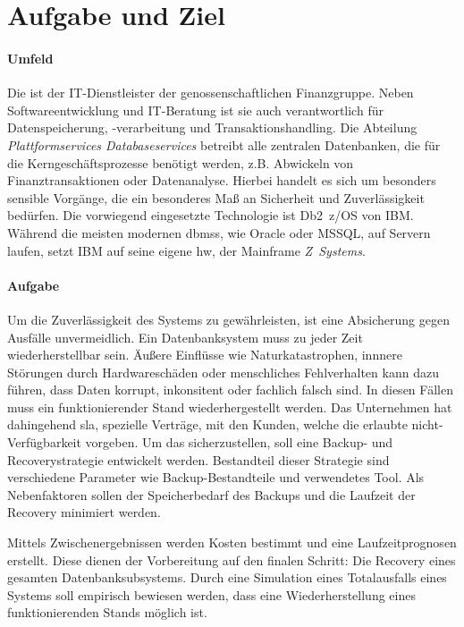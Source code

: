 \chapter{Aufgabe und Ziel}

\subsubsection{Umfeld}
Die \FirmenName ist der IT-Dienstleister der genossenschaftlichen Finanzgruppe. Neben Softwareentwicklung und IT-Beratung ist sie auch verantwortlich für Datenspeicherung, -verarbeitung und Transaktionshandling. Die Abteilung \emph{Plattformservices Databaseservices} betreibt alle zentralen Datenbanken, die für die Kerngeschäftsprozesse benötigt werden, z.B. Abwickeln von Finanztransaktionen oder Datenanalyse. Hierbei handelt es sich um besonders sensible Vorgänge, die ein besonderes Maß an Sicherheit und Zuverlässigkeit bedürfen. Die vorwiegend eingesetzte Technologie ist Db2~z/OS von IBM. Während die meisten modernen \acp{dbms}, wie Oracle oder MSSQL, auf Servern laufen, setzt IBM auf seine eigene \ac{hw}, der Mainframe \emph{\mbox{Z Systems}}. 

\subsubsection{Aufgabe}
Um die Zuverlässigkeit des Systems zu gewährleisten, ist eine Absicherung gegen Ausfälle unvermeidlich. Ein Datenbanksystem muss zu jeder Zeit wiederherstellbar sein. Äußere Einflüsse wie Naturkatastrophen, innnere Störungen durch Hardwareschäden oder menschliches Fehlverhalten kann dazu führen, dass Daten korrupt, inkonsitent oder fachlich falsch sind. In diesen Fällen muss ein funktionierender Stand wiederhergestellt werden. Das Unternehmen hat dahingehend \ac{sla}, spezielle Verträge, mit den Kunden, welche die erlaubte nicht-Verfügbarkeit vorgeben. Um das sicherzustellen, soll eine Backup- und Recoverystrategie entwickelt werden. Bestandteil dieser Strategie sind verschiedene Parameter wie Backup-Bestandteile und verwendetes Tool. Als Nebenfaktoren sollen der Speicherbedarf des Backups und die Laufzeit der Recovery minimiert werden.

Mittels Zwischenergebnissen werden Kosten bestimmt und eine Laufzeitprognosen erstellt. Diese dienen der Vorbereitung auf den finalen Schritt: Die Recovery eines gesamten Datenbanksubsystems. Durch eine Simulation eines Totalausfalls eines Systems soll empirisch bewiesen werden, dass eine Wiederherstellung eines funktionierenden Stands möglich ist.

